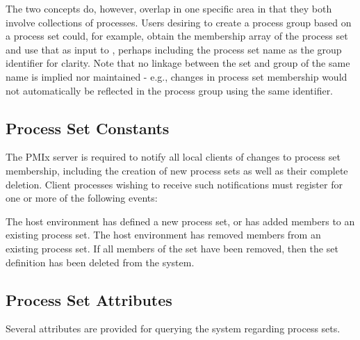 The two concepts do, however, overlap in one specific area in that they both
involve collections of processes. Users desiring to create a process group
based on a process set could, for example, obtain the membership array of the
process set and use that as input to , perhaps
including the process set name as the group identifier for clarity. Note that
no linkage between the set and group of the same name is implied nor
maintained - e.g., changes in process set membership would not automatically be
reflected in the process group using the same identifier.


\subsection{Process Set Constants}

The \ac{PMIx} server is required to notify all local clients of changes to
process set membership, including the creation of new process sets as well as
their complete deletion. Client processes wishing to receive such
notifications must register for one or more of the following events:

\begin{constantdesc}
%
The host environment has defined a new process set, or has added members to
an existing process set.
%
The host environment has removed members from an existing process set. If all
members of the set have been removed, then the set definition has been
deleted from the system.
%
\end{constantdesc}


\subsection{Process Set Attributes}

Several attributes are provided for querying the system regarding process sets.

%

%

